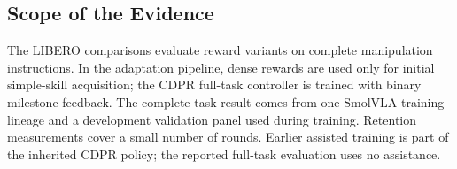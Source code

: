 \subsection{Scope of the Evidence}
The LIBERO comparisons evaluate reward variants on complete manipulation instructions. In the adaptation pipeline, dense rewards are used only for initial simple-skill acquisition; the CDPR full-task controller is trained with binary milestone feedback. The complete-task result comes from one SmolVLA training lineage and a development validation panel used during training. Retention measurements cover a small number of rounds. Earlier assisted training is part of the inherited CDPR policy; the reported full-task evaluation uses no assistance.
